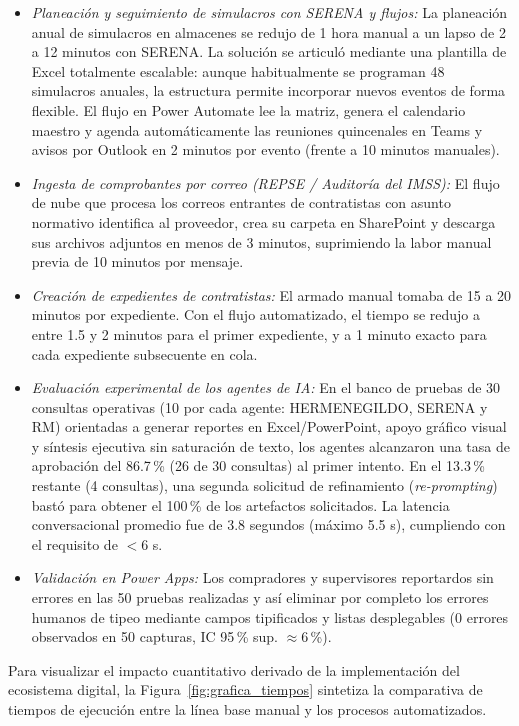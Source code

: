 \begin{enumerate}
\begin{itemize}
        \item \emph{Planeación y seguimiento de simulacros con SERENA y flujos:} La planeación anual de simulacros en almacenes se redujo de 1 hora manual a un lapso de 2 a 12 minutos con SERENA. La solución se articuló mediante una plantilla de Excel totalmente escalable: aunque habitualmente se programan 48 simulacros anuales, la estructura permite incorporar nuevos eventos de forma flexible. El flujo en Power Automate lee la matriz, genera el calendario maestro y agenda automáticamente las reuniones quincenales en Teams y avisos por Outlook en 2 minutos por evento (frente a 10 minutos manuales).
        \item \emph{Ingesta de comprobantes por correo (REPSE / Auditoría del IMSS):} El flujo de nube que procesa los correos entrantes de contratistas con asunto normativo identifica al proveedor, crea su carpeta en SharePoint y descarga sus archivos adjuntos en menos de 3 minutos, suprimiendo la labor manual previa de 10 minutos por mensaje.
        \item \emph{Creación de expedientes de contratistas:} El armado manual tomaba de 15 a 20 minutos por expediente. Con el flujo automatizado, el tiempo se redujo a entre 1.5 y 2 minutos para el primer expediente, y a 1 minuto exacto para cada expediente subsecuente en cola.
        \item \emph{Evaluación experimental de los agentes de IA:} En el banco de pruebas de 30 consultas operativas (10 por cada agente: HERMENEGILDO, SERENA y RM) orientadas a generar reportes en Excel/PowerPoint, apoyo gráfico visual y síntesis ejecutiva sin saturación de texto, los agentes alcanzaron una tasa de aprobación del 86.7\,\% (26 de 30 consultas) al primer intento. En el 13.3\,\% restante (4 consultas), una segunda solicitud de refinamiento (\emph{re-prompting}) bastó para obtener el 100\,\% de los artefactos solicitados. La latencia conversacional promedio fue de 3.8 segundos (máximo 5.5 s), cumpliendo con el requisito de $<6$ s.
        \item \emph{Validación en Power Apps:} Los compradores y supervisores reportardos sin errores en las 50 pruebas realizadas y así eliminar por completo los errores humanos de tipeo mediante campos tipificados y listas desplegables (0 errores observados en 50 capturas, IC 95\,\% sup. $\approx 6$\,\%).
    \end{itemize}
\end{enumerate}

Para visualizar el impacto cuantitativo derivado de la implementación del ecosistema digital, la Figura~\ref{fig:grafica_tiempos} sintetiza la comparativa de tiempos de ejecución entre la línea base manual y los procesos automatizados.

